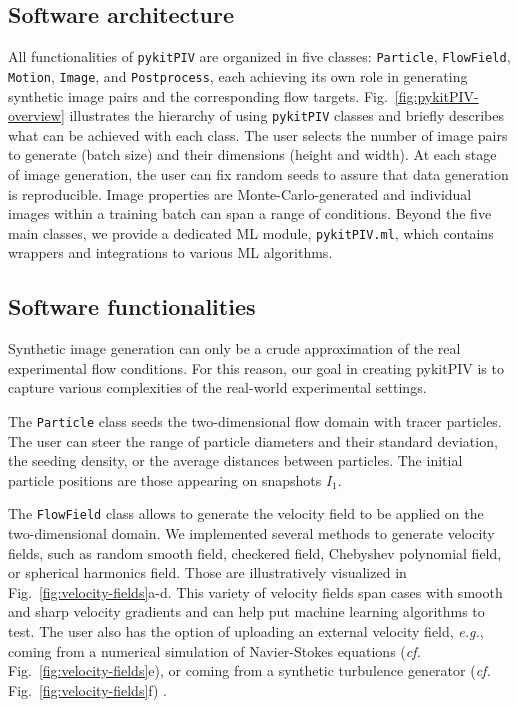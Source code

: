 \documentclass[a4paper,fleqn]{cas-dc}
\begin{document}
\subsection{Software architecture}

All functionalities of \texttt{pykitPIV} are organized in five classes: \texttt{Particle}, \texttt{FlowField}, \texttt{Motion}, \texttt{Image}, and \texttt{Postprocess}, each achieving its own role in generating synthetic image pairs and the corresponding flow targets. Fig.~\ref{fig:pykitPIV-overview} illustrates the hierarchy of using \texttt{pykitPIV} classes and briefly describes what can be achieved with each class. The user selects the number of image pairs to generate (batch size) and their dimensions (height and width). At each stage of image generation, the user can fix random seeds to assure that data generation is reproducible. Image properties are Monte-Carlo-generated and individual images within a training batch can span a range of conditions. Beyond the five main classes, we provide a dedicated ML module, \texttt{pykitPIV.ml}, which contains wrappers and integrations to various ML algorithms.



\subsection{Software functionalities}

Synthetic image generation can only be a crude approximation of the real experimental flow conditions. For this reason, our goal in creating pykitPIV is to capture various complexities of the real-world experimental settings.

The \texttt{Particle} class seeds the two-dimensional flow domain with tracer particles. The user can steer the range of particle diameters and their standard deviation, the seeding density, or the average distances between particles. The initial particle positions are those appearing on snapshots $I_1$.

The \texttt{FlowField} class allows to generate the velocity field to be applied on the two-dimensional domain. We implemented several methods to generate velocity fields, such as random smooth field, checkered field, Chebyshev polynomial field, or spherical harmonics field. Those are illustratively visualized in Fig.~\ref{fig:velocity-fields}a-d. This variety of velocity fields span cases with smooth and sharp velocity gradients and can help put machine learning algorithms to test. The user also has the option of uploading an external velocity field, \textit{e.g.}, coming from a numerical simulation of Navier-Stokes equations (\textit{cf.} Fig.~\ref{fig:velocity-fields}e), or coming from a synthetic turbulence generator (\textit{cf.} Fig.~\ref{fig:velocity-fields}f) \citep{saad2017scalable, richards2018fast}.
\end{document}
